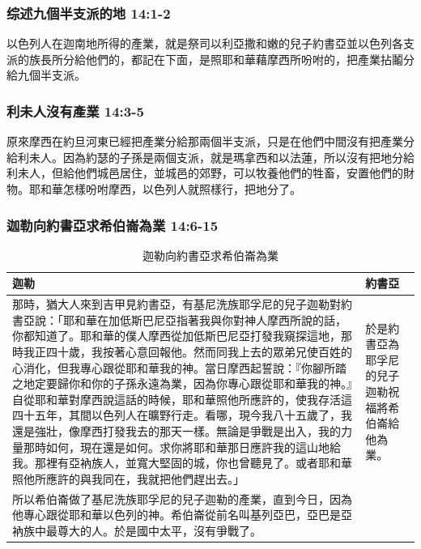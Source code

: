 \subsubsection{综述九個半支派的地 14:1-2}
以色列人在迦南地所得的產業，就是祭司以利亞撒和嫩的兒子約書亞並以色列各支派的族長所分給他們的，都記在下面，是照耶和華藉摩西所吩咐的，把產業拈鬮分給九個半支派。

\subsubsection{利未人沒有產業 14:3-5}
原來摩西在約旦河東已經把產業分給那兩個半支派，只是在他們中間沒有把產業分給利未人。因為約瑟的子孫是兩個支派，就是瑪拿西和以法蓮，所以沒有把地分給利未人，但給他們城邑居住，並城邑的郊野，可以牧養他們的牲畜，安置他們的財物。耶和華怎樣吩咐摩西，以色列人就照樣行，把地分了。

\subsubsection{迦勒向約書亞求希伯崙為業 14:6-15}
\begin{table}[H]
\centering
\begin{tabular}{p{15.7cm}|p{1.18cm}}\hline\hline
迦勒&約書亞\\\hline
那時，猶大人來到吉甲見約書亞，有基尼洗族耶孚尼的兒子迦勒對約書亞說：「耶和華在加低斯巴尼亞指著我與你對神人摩西所說的話，你都知道了。耶和華的僕人摩西從加低斯巴尼亞打發我窺探這地，那時我正四十歲，我按著心意回報他。然而同我上去的眾弟兄使百姓的心消化，但我專心跟從耶和華我的神。當日摩西起誓說：『你腳所踏之地定要歸你和你的子孫永遠為業，因為你專心跟從耶和華我的神。』自從耶和華對摩西說這話的時候，耶和華照他所應許的，使我存活這四十五年，其間以色列人在曠野行走。看哪，現今我八十五歲了，我還是強壯，像摩西打發我去的那天一樣。無論是爭戰是出入，我的力量那時如何，現在還是如何。求你將耶和華那日應許我的這山地給我。那裡有亞衲族人，並寬大堅固的城，你也曾聽見了。或者耶和華照他所應許的與我同在，我就把他們趕出去。」
&於是約書亞為耶孚尼的兒子迦勒祝福將希伯崙給他為業。\\\hline
所以希伯崙做了基尼洗族耶孚尼的兒子迦勒的產業，直到今日，因為他專心跟從耶和華以色列的神。希伯崙從前名叫基列亞巴，亞巴是亞衲族中最尊大的人。於是國中太平，沒有爭戰了。&\\\hline
 \end{tabular}
\caption{迦勒向約書亞求希伯崙為業}
\end{table}




